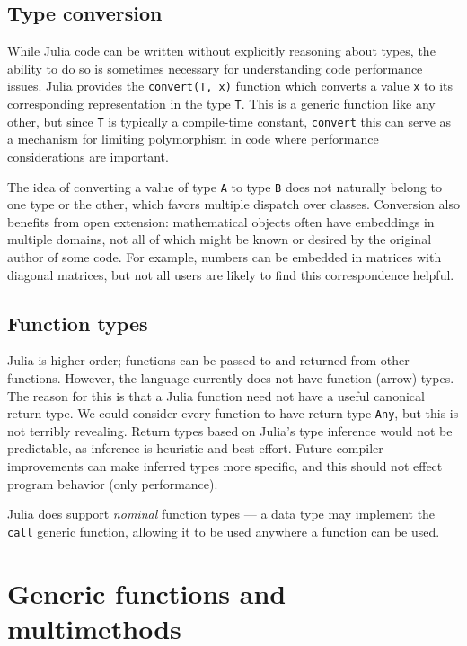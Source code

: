 \documentclass[10pt, preprint]{sigplanconf}
\begin{document}
\subsection{Type conversion}

While Julia code can be written without
explicitly reasoning about types, the ability to do so is sometimes necessary for
understanding code performance issues. Julia provides the \verb|convert(T, x)|
function which converts a value \verb|x| to its corresponding representation in
the type \verb|T|. This is a generic function like any other, but since
\verb|T| is typically a compile-time constant, \verb|convert| this can serve
as a mechanism for limiting polymorphism in code where performance
considerations are important.

The idea of converting a value of type \verb|A| to type \verb|B|
does not naturally belong to one type or the other, which favors multiple
dispatch over classes. Conversion also benefits from open extension:
mathematical objects often have embeddings in multiple domains, not all of
which might be known or desired by the original author of some code. For
example, numbers can be embedded in matrices with diagonal matrices, but not
all users are likely to find this correspondence helpful.

\subsection{Function types}

Julia is higher-order; functions can be passed to and returned from other
functions.
However, the language currently does not have function (arrow) types.
The reason for this is that a Julia function need not have a useful canonical
return type.
We could consider every function to have return type \verb|Any|, but this is
not terribly revealing.
Return types based on Julia's type inference would not be predictable, as
inference is heuristic and best-effort.
Future compiler improvements can make inferred types more specific,
and this should not effect program behavior (only performance).

Julia does support \emph{nominal} function types --- a data type may implement
the \verb|call| generic function, allowing it to be used anywhere a function
can be used.


\section{Generic functions and multimethods}
\end{document}
